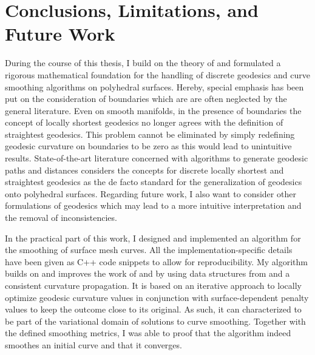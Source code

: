 \documentclass[crop=false]{stdlocal}
\begin{document}
\section{Conclusions, Limitations, and Future Work} %
\label{sec:conclusions}

  During the course of this thesis, I build on the theory of \textcite{polthier2006} and formulated a rigorous mathematical foundation for the handling of discrete geodesics and curve smoothing algorithms on polyhedral surfaces.
  Hereby, special emphasis has been put on the consideration of boundaries which are are often neglected by the general literature.
  Even on smooth manifolds, in the presence of boundaries the concept of locally shortest geodesics no longer agrees with the definition of straightest geodesics.
  This problem cannot be eliminated by simply redefining geodesic curvature on boundaries to be zero as this would lead to unintuitive results.
  State-of-the-art literature concerned with algorithms to generate geodesic paths and distances considers the concepts for discrete locally shortest and straightest geodesics as the de facto standard for the generalization of geodesics onto polyhedral surfaces.
  Regarding future work, I also want to consider other formulations of geodesics which may lead to a more intuitive interpretation and the removal of inconsistencies.


  In the practical part of this work, I designed and implemented an algorithm for the smoothing of surface mesh curves.
  All the implementation-specific details have been given as C++ code snippets to allow for reproducibility.
  My algorithm builds on and improves the work of \textcite{martinez2005} and \textcite{lawonn2014} by using data structures from \textcite{mancinelli2022} and a consistent curvature propagation.
  It is based on an iterative approach to locally optimize geodesic curvature values in conjunction with surface-dependent penalty values to keep the outcome close to its original.
  As such, it can characterized to be part of the variational domain of solutions to curve smoothing.
  Together with the defined smoothing metrics, I was able to proof that the algorithm indeed smoothes an initial curve and that it converges.
\end{document}
